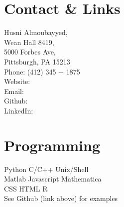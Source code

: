 \documentclass[]{deedy-resume-openfont}
\begin{document}
%
%

%
%


%
%

\begin{minipage}[t]{0.33\textwidth} 




\section{\color{Blue} Contact \& Links} 
Husni Almoubayyed,\\ 
Wean Hall 8419, \\ 5000 Forbes Ave, \\ Pittsburgh, PA 15213 \\
Phone: (412) 345 $-$ 1875 \\
Website: \href{https://www.husni.space}{} \\
Email: \href{mailto:husnial@cmu.edu}{} \\
Github: \href{https://github.com/hsnee}{} \\
LinkedIn:  \href{https://www.linkedin.com/in/husnialmoubayyed}{} 
\sectionsep




\section{\color{Blue} Programming}
\textbullet{} Python \textbullet{}  C/C++ \textbullet{} Unix/Shell  \\
\textbullet{} Matlab \textbullet{} Javascript \textbullet{} Mathematica  \\
\textbullet{} CSS \textbullet{} HTML \textbullet{} R \\
See Github (link above) for examples
\sectionsep



\end{minipage}
\end{document}
